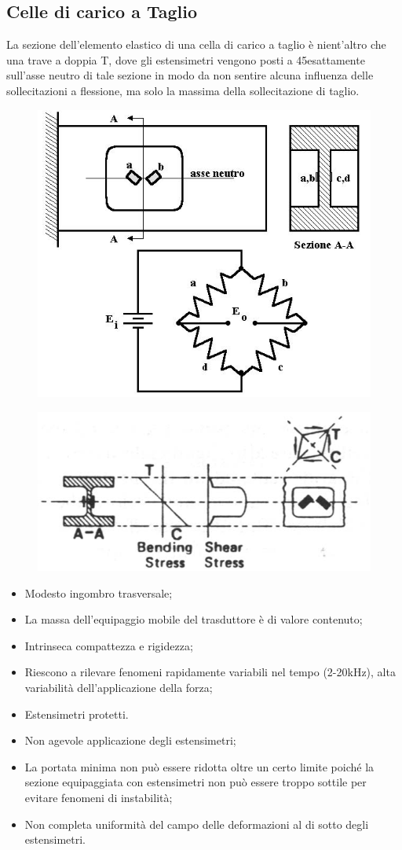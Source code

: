 \documentclass[a4paper, 15pt]{article}
\newcommand{\cmark}{\ding{51}}
\newcommand{\xmark}{\ding{55}}
\begin{document}
\subsection{Celle di carico a Taglio}		
\begin{adjustwidth}{2in}{}	
 		La sezione dell'elemento elastico di una cella di carico a taglio è nient'altro che una trave a doppia T, dove gli estensimetri vengono posti a 45\degree esattamente sull'asse neutro di tale sezione in modo da non sentire alcuna influenza delle sollecitazioni a flessione, ma solo la massima della sollecitazione di taglio. 
\begin{figure}[H]
	\centering
	\includegraphics[width=0.3\linewidth]{immagini/18}
	\label{fig:18}
\end{figure}
\begin{figure}[H]
	\centering
	\includegraphics[width=0.3\linewidth]{immagini/19}
	\label{fig:19}
\end{figure}
 		\begin{itemize}[label=\textcolor{green}{\cmark}]
 			\item Modesto ingombro trasversale;
 			\item La massa dell'equipaggio mobile del trasduttore è di valore contenuto;
 			\item Intrinseca compattezza e rigidezza;
 			\item Riescono a rilevare fenomeni rapidamente variabili nel tempo (2-20kHz), alta variabilità dell'applicazione della forza;
 			\item Estensimetri protetti. 			
 		\end{itemize}
 	
 		\begin{itemize}[label=\textcolor{red}{\xmark}]
 			\item Non agevole applicazione degli estensimetri;
 			\item La portata minima non può essere ridotta oltre un certo limite poiché la
 			sezione equipaggiata con estensimetri non può essere troppo sottile per
 			evitare fenomeni di instabilità;
 			\item Non completa uniformità del campo delle deformazioni al di sotto degli
 			estensimetri.
 			

\end{itemize}
\end{adjustwidth}
\end{document}
